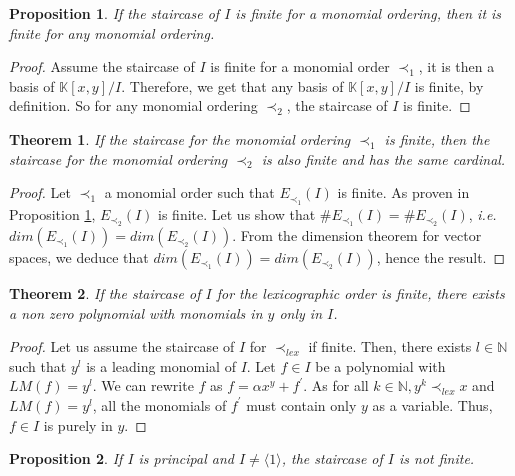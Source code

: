 \documentclass{article}
\newtheorem{theorem}{Theorem}[section]
\newtheorem{proposition}{Proposition}[section]
\begin{document}
\begin{proposition} \label{proposition:staircase-finite-any-order}
    If the staircase of $I$ is finite for a monomial ordering, then it is finite for any monomial ordering.
\end{proposition}

\begin{proof} 
    Assume the staircase of $I$ is finite for a monomial order $\prec_{1}$, it is then a basis of $\mathbb{K}[x, y] / I$. Therefore, we get that any basis of $\mathbb{K}[x, y] / I$ is finite, by definition. So for any monomial ordering $\prec_{2}$, the staircase of $I$ is finite.  
\end{proof}

\begin{theorem}
    If the staircase for the monomial ordering $\prec_{1}$ is finite, then the staircase for the monomial ordering $\prec_{2}$ is also finite and has the same cardinal.
\end{theorem}

\begin{proof}
    Let $\prec_{1}$ a monomial order such that $E_{\prec_{1}}(I)$ is finite. As proven in Proposition \ref{proposition:staircase-finite-any-order}, $E_{\prec_{2}}(I)$ is finite. Let us show that $\# E_{\prec_{1}}(I) = \# E_{\prec_{2}}(I)$, \textit{i.e.} $dim(E_{\prec_{1}}(I)) = dim(E_{\prec_{2}}(I))$. From the dimension theorem for vector spaces, we deduce that $dim(E_{\prec_{1}}(I)) = dim(E_{\prec_{2}}(I))$, hence the result.
\end{proof}

\begin{theorem}
    If the staircase of $I$ for the lexicographic order is finite, there exists a non zero polynomial with monomials in $y$ only in $I$.
\end{theorem}

\begin{proof}
    Let us assume the staircase of $I$ for $\prec_{lex}$ if finite. Then, there exists $l \in \mathbb{N}$ such that $y^{l}$ is a leading monomial of $I$. Let $f \in I$ be a polynomial with $LM(f) = y^{l}$. We can rewrite $f$ as $f = \alpha x^{y} + f^{\prime}$. As for all $k \in \mathbb{N}, y^{k} \prec_{lex} x$ and $LM(f) = y^{l}$, all the monomials of $f^{\prime}$ must contain only $y$ as a variable. Thus,  $f \in I$ is purely in $y$.
\end{proof}

\begin{proposition}
    If $I$ is principal and $I \neq \langle 1 \rangle$, the staircase of $I$ is not finite. 
\end{proposition}
\end{document}
